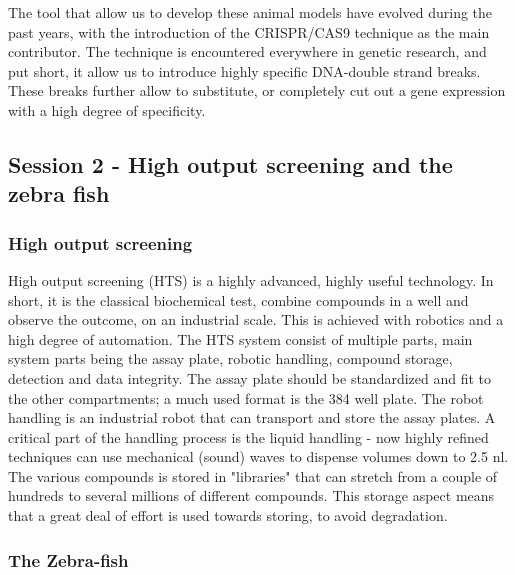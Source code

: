\documentclass[12p]{article}
\begin{document}
The tool that allow us to develop these animal models have evolved during the past years, with the introduction of the CRISPR/CAS9 technique as the main contributor.
The technique is encountered everywhere in genetic research, and put short, it allow us to introduce highly specific DNA-double strand breaks.
These breaks further allow to substitute, or completely cut out a gene expression with a high degree of specificity.

\subsection*{Session 2 - High output screening and the zebra fish}

\subsubsection*{High output screening}

High output screening (HTS) is a highly advanced, highly useful technology. 
In short, it is the classical biochemical test, combine compounds in a well and observe the outcome, on an industrial scale.
This is achieved with robotics and a high degree of automation.
The HTS system consist of multiple parts, main system parts being the assay plate, robotic handling, compound storage, detection and data integrity.
The assay plate should be standardized and fit to the other compartments; a much used format is the 384 well plate.
The robot handling is an industrial robot that can transport and store the assay plates. 
A critical part of the handling process is the liquid handling - now highly refined techniques can use mechanical (sound) waves to dispense volumes down to 2.5 nl.
The various compounds is stored in "libraries" that can stretch from a couple of hundreds to several millions of different compounds.
This storage aspect means that a great deal of effort is used towards storing, to avoid degradation.

\subsubsection*{The Zebra-fish}
\end{document}
